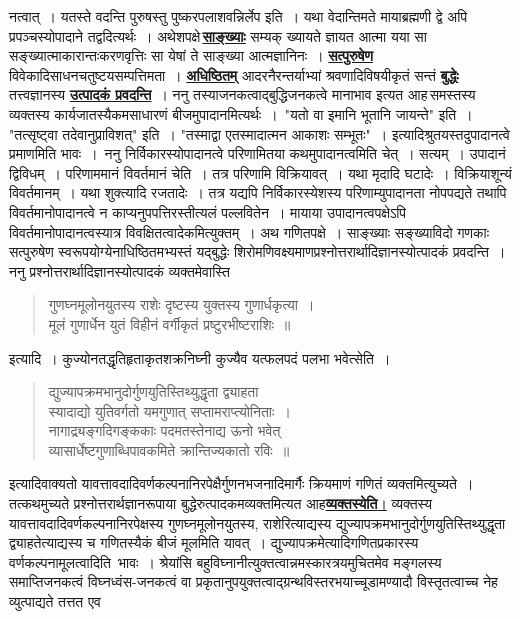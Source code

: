 \documentclass[11pt, openany]{book}
\begin{document}
\newpage

\begin{sloppypar}
\noindent नत्वात्~। यतस्ते वदन्ति पुरुषस्तु पुष्करपलाशवन्निर्लेप इति~। यथा वेदान्तिमते मायाब्रह्मणी द्वे अपि प्रपञ्चस्योपादाने तद्वदित्यर्थः~। अथेशपक्षे\textendash \,\hyperref[1.1]{\textbf{साङ्ख्याः}} सम्यक् ख्यायते ज्ञायत आत्मा यया सा सङ्ख्यात्माकारान्तःकरणवृत्तिः सा येषां ते साङ्ख्या आत्मज्ञानिनः~। \hyperref[1.1]{\textbf{सत्पुरुषेण}} विवेकादिसाधनचतुष्टयसम्पत्तिमता~। \hyperref[1.1]{\textbf{अधिष्ठितम्}} आदरनैरन्तर्याभ्यां श्रवणादिविषयीकृतं सन्तं \hyperref[1.1]{\textbf{बुद्धेः}} तत्त्वज्ञानस्य \hyperref[1.1]{\textbf{उत्पादकं प्रवदन्ति}}~। ननु तस्याजनकत्वाद्बुद्धिजनकत्वे मानाभाव इत्यत आह\textendash \,समस्तस्य व्यक्तस्य कार्यजातस्यैकमसाधारणं बीजमुपादानमित्यर्थः~।~{\color{violet}"यतो वा इमानि भूतानि जायन्ते"} इति~। {\color{violet}"तत्सृष्ट्वा तदेवानुप्राविशत्"} इति~। {\color{violet}"तस्माद्वा एतस्मादात्मन आकाशः सम्भूतः"}~। इत्यादिश्रुतयस्तदुपादानत्वे प्रमाणमिति भावः~।~ननु निर्विकारस्योपादानत्वे परिणामितया कथमुपादानत्वमिति चेत्~। सत्यम्~। उपादानं द्विविधम्~। परिणाममानं विवर्तमानं चेति~। तत्र परिणामि विक्रियावत्~। यथा मृदादि घटादेः~। विक्रियाशून्यं विवर्तमानम्~। यथा शुक्त्यादि रजतादेः~। तत्र यद्यपि निर्विकारस्येशस्य परिणाम्युपादानता नोपपद्यते तथापि विवर्तमानोपादानत्वे न काप्यनुपपत्तिरस्तीत्यलं पल्लवितेन~। मायाया उपादानत्वपक्षेऽपि विवर्तमानोपादानत्वस्यात्र विवक्षितत्वादेकमित्युक्तम्~। अथ गणितपक्षे~। साङ्ख्याः सङ्ख्याविदो गणकाः सत्पुरुषेण स्वरूपयोग्येनाधिष्ठितमभ्यस्तं यद्बुद्धेः शिरोमणिवक्ष्यमाणप्रश्नोत्तरार्थादिज्ञानस्योत्पादकं प्रवदन्ति~। ननु प्रश्नोत्तरार्थादिज्ञानस्योत्पादकं व्यक्तमेवास्ति\textendash

\begin{quote}
{\color{violet}गुणघ्नमूलोनयुतस्य राशेः दृष्टस्य युक्तस्य गुणार्धकृत्या~।\\
मूलं गुणार्धेन युतं विहीनं वर्गीकृतं प्रष्टुरभीष्टराशिः~॥}
\end{quote}

इत्यादि~। कुज्योनतद्धृतिहृताकृतशक्रनिघ्नी कुज्यैव यत्फलपदं पलभा भवेत्सेति~।

\begin{quote}
{\color{violet}द्युज्यापक्रमभानुदोर्गुणयुतिस्तिथ्युद्धृता द्व्याहता \\
स्यादाद्यो युतिवर्गतो यमगुणात् सप्तामराप्त्योनिताः~।\\
नागाद्र्यङ्गदिगङ्ककाः पदमतस्तेनाद्य ऊनो भवेत्\\
व्यासार्धेष्टगुणाब्धिपावकमिते क्रान्तिज्यकातो रविः~॥}
\end{quote}

इत्यादिवाक्यतो यावत्तावदादिवर्णकल्पनानिरपेक्षैर्गुणनभजनादिमार्गैः क्रियमाणं गणितं व्यक्तमित्युच्यते~। तत्कथमुच्यते प्रश्नोत्तरार्थज्ञानरूपाया बुद्धेरुत्पादकमव्यक्तमित्यत आह\textendash \;\hyperref[1.1]{\textbf{व्यक्तस्येति}\;।} व्यक्तस्य यावत्तावदादिवर्णकल्पनानिरपेक्षस्य गुणघ्नमूलोनयुतस्य, राशेरित्याद्यस्य द्युज्यापक्रमभानुदोर्गुणयुतिस्तिथ्युद्धृता द्व्याहतेत्याद्यस्य च गणितस्यैकं बीजं मूलमिति यावत्~। द्युज्यापक्रमेत्यादिगणितप्रकारस्य वर्णकल्पनामूलत्वादिति~भावः~। श्रेयांसि बहुविघ्नानीत्युक्तत्वान्नमस्कारत्रयमुचितमेव मङ्गलस्य समाप्तिजनकत्वं विघ्नध्वंस-जनकत्वं वा प्रकृतानुपयुक्तत्वाद्ग्रन्थविस्तरभयाच्चूडामण्यादौ विस्तृतत्वाच्च नेह व्युत्पाद्यते तत्तत एव 
\end{sloppypar}
\end{document}

